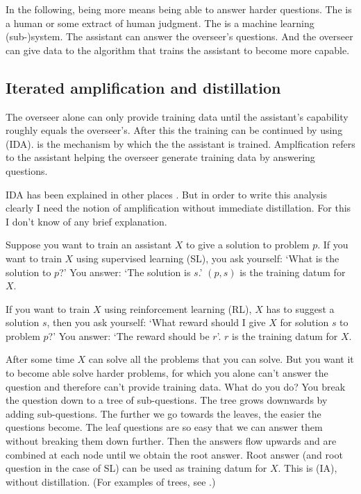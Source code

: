 \documentclass{farlamp}
\begin{document}
In the following, being more  means being able to answer harder
questions. The  is a human or some extract of human judgment. The
 is a machine learning (sub-)system. The assistant can answer
the overseer's questions. And the overseer can give data to the algorithm
that trains the assistant to become more capable.


\subsection{Iterated amplification and distillation}

The overseer alone can only provide training data until the assistant's
capability roughly equals the overseer's. After this the training can be
continued by using  (IDA).
 is the mechanism by which the the assistant is trained.
Amplfication refers to the assistant helping the overseer generate training data
by answering questions.

IDA has been explained in other places \parencite{CotrIDA, ESSMLPIDA}. But in
order to write this analysis clearly I need the notion of amplification without
immediate distillation. For this I don't know of any brief explanation.

Suppose you want to train an assistant $X$ \parencite[symbols taken
from][]{CSASupAmp} to give a solution to problem $p$. If you want to train $X$
using supervised learning (SL), you ask yourself: ‘What is the solution to $p$?’
You answer: ‘The solution is $s$.’ $(p, s)$ is the training datum for $X$.

If you want to train $X$ using reinforcement learning (RL), $X$ has to suggest a
solution $s$, then you ask yourself: ‘What reward should I give $X$ for solution
$s$ to problem $p$?’ You answer: ‘The reward should be $r$’. $r$ is the training
datum for $X$.

After some time $X$ can solve all the problems that you can solve. But you want
it to become able solve harder problems, for which you alone can't answer the
question and therefore can't provide training data. What do you do? You break
the question down to a tree of sub-questions. The tree grows downwards by adding
sub-questions. The further we go towards the leaves, the easier the questions
become. The leaf questions are so easy that we can answer them without breaking
them down further. Then the answers flow upwards and are combined at each node
until we obtain the root answer. Root answer (and root question in the case of
SL) can be used as training datum for $X$. This is  (IA), without distillation. (For examples of trees, see
\textcite{StuhFacCog}.)
\end{document}
